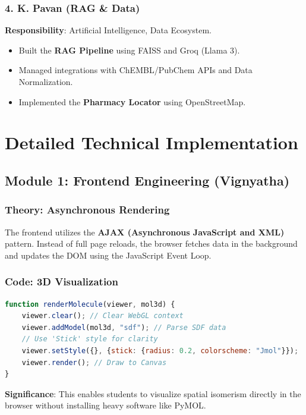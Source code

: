\documentclass[a4paper,12pt]{report}
\begin{document}
\section{4. K. Pavan (RAG \& Data)}
\textbf{Responsibility}: Artificial Intelligence, Data Ecosystem.
\begin{itemize}
    \item Built the \textbf{RAG Pipeline} using FAISS and Groq (Llama 3).
    \item Managed integrations with ChEMBL/PubChem APIs and Data Normalization.
    \item Implemented the \textbf{Pharmacy Locator} using OpenStreetMap.
\end{itemize}

\newpage

\part{Detailed Technical Implementation}

\chapter{Module 1: Frontend Engineering (Vignyatha)}

\section{Theory: Asynchronous Rendering}
The frontend utilizes the \textbf{AJAX (Asynchronous JavaScript and XML)} pattern. Instead of full page reloads, the browser fetches data in the background and updates the DOM using the JavaScript Event Loop.

\section{Code: 3D Visualization}
\begin{lstlisting}[language=JavaScript, caption=3Dmol.js Logic]
function renderMolecule(viewer, mol3d) {
    viewer.clear(); // Clear WebGL context
    viewer.addModel(mol3d, "sdf"); // Parse SDF data
    // Use 'Stick' style for clarity
    viewer.setStyle({}, {stick: {radius: 0.2, colorscheme: "Jmol"}});
    viewer.render(); // Draw to Canvas
}
\end{lstlisting}
\textbf{Significance}: This enables students to visualize spatial isomerism directly in the browser without installing heavy software like PyMOL.
\end{document}
